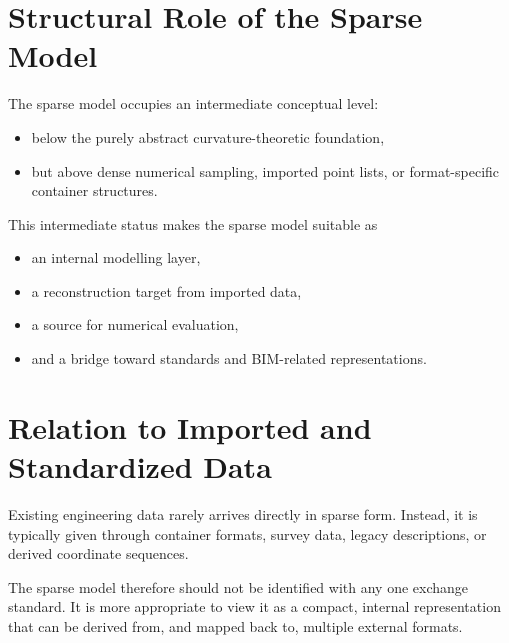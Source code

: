 \section{Structural Role of the Sparse Model}

\begin{remark}
The sparse model occupies an intermediate conceptual level:
\begin{itemize}
  \item below the purely abstract curvature-theoretic foundation,
  \item but above dense numerical sampling, imported point lists, or
        format-specific container structures.
\end{itemize}
\end{remark}

\begin{remark}
This intermediate status makes the sparse model suitable as
\begin{itemize}
  \item an internal modelling layer,
  \item a reconstruction target from imported data,
  \item a source for numerical evaluation,
  \item and a bridge toward standards and BIM-related representations.
\end{itemize}
\end{remark}

\section{Relation to Imported and Standardized Data}

\begin{remark}
Existing engineering data rarely arrives directly in sparse form.
Instead, it is typically given through container formats, survey data,
legacy descriptions, or derived coordinate sequences.
\end{remark}

\begin{remark}
The sparse model therefore should not be identified with any one
exchange standard. It is more appropriate to view it as a compact,
internal representation that can be derived from, and mapped back to,
multiple external formats.
\end{remark}


